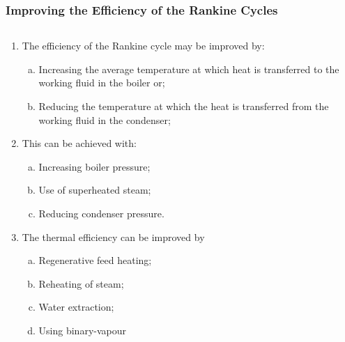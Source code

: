 \documentclass[10pt,compress,handout,ignorenonframetext]{beamer}
\begin{document}
\begin{frame}
 \frametitle{Improving the Efficiency of the Rankine Cycles}
   \begin{columns}
      \begin{column}[c]{0.5\linewidth}
         \begin{enumerate}\scriptsize
            \item<1-> The efficiency of the Rankine cycle may be improved by:
              \begin{enumerate}[(a)]\scriptsize
                 \item <1-> Increasing the average temperature at which heat is transferred to the working fluid in the boiler or;
                 \item <1-> Reducing the temperature at which the heat is transferred from the working fluid in the condenser;
              \end{enumerate} 
            \item <2-> This can be achieved with:
              \begin{enumerate}[(a)]\scriptsize
                 \item <2-> Increasing boiler pressure;
                 \item <2-> Use of superheated steam;
                 \item <2-> Reducing condenser pressure.
              \end{enumerate}
            \item <3-> The thermal efficiency can be improved by
              \begin{enumerate}[(a)]\scriptsize
                 \item <3-> Regenerative feed heating;
                 \item <3-> Reheating of steam;
                 \item <3-> Water extraction;
                 \item <3-> Using binary-vapour
              \end{enumerate}
         \end{enumerate}  
      \end{column}
      \begin{column}[c]{0.5\linewidth}
\end{column}
\end{columns}
\end{frame}
\end{document}
